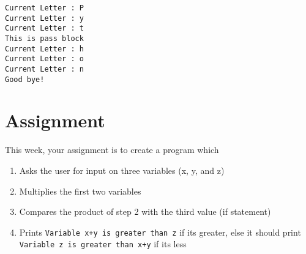 \documentclass{scrartcl}
\begin{document}
\begin{verbatim}
Current Letter : P
Current Letter : y
Current Letter : t
This is pass block
Current Letter : h
Current Letter : o
Current Letter : n
Good bye!
\end{verbatim}
\section{Assignment}
\label{sec:org36c0360}
This week, your assignment is to create a program which
\begin{enumerate}
\item Asks the user for input on three variables (x, y, and z)
\item Multiplies the first two variables
\item Compares the product of step 2 with the third value (if statement)
\item Prints
\texttt{Variable x+y is greater than z}
if its greater, else it should print
\texttt{Variable z is greater than x+y}
if its less
\end{enumerate}
\end{document}
